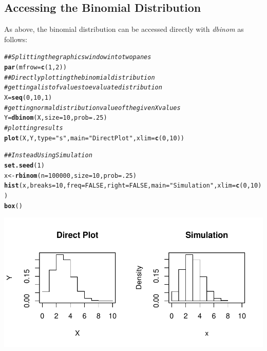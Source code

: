 \documentclass{report}\usepackage[]{graphicx}\usepackage[]{color}
\makeatletter
\def\maxwidth{ %
  \ifdim\Gin@nat@width>\linewidth
    \linewidth
  \else
    \Gin@nat@width
  \fi
}
\newcommand{\hlnum}[1]{\textcolor[rgb]{0.686,0.059,0.569}{#1}}%
\newcommand{\hlstr}[1]{\textcolor[rgb]{0.192,0.494,0.8}{#1}}%
\newcommand{\hlcom}[1]{\textcolor[rgb]{0.678,0.584,0.686}{\textit{#1}}}%
\newcommand{\hlstd}[1]{\textcolor[rgb]{0.345,0.345,0.345}{#1}}%
\newcommand{\hlkwb}[1]{\textcolor[rgb]{0.69,0.353,0.396}{#1}}%
\newcommand{\hlkwc}[1]{\textcolor[rgb]{0.333,0.667,0.333}{#1}}%
\newcommand{\hlkwd}[1]{\textcolor[rgb]{0.737,0.353,0.396}{\textbf{#1}}}%
\newenvironment{kframe}{%
 \def\at@end@of@kframe{}%
 \ifinner\ifhmode%
  \def\at@end@of@kframe{\end{minipage}}%
  \begin{minipage}{\columnwidth}%
 \fi\fi%
 \def\FrameCommand##1{\hskip\@totalleftmargin \hskip-\fboxsep
 \colorbox{shadecolor}{##1}\hskip-\fboxsep
     \hskip-\linewidth \hskip-\@totalleftmargin \hskip\columnwidth}%
 \MakeFramed {\advance\hsize-\width
   \@totalleftmargin\z@ \linewidth\hsize
   \@setminipage}}%
 {\par\unskip\endMakeFramed%
 \at@end@of@kframe}
\newenvironment{knitrout}{}{} %
\makeatother
\begin{document}
\subsection{Accessing the Binomial Distribution}
As above, the binomial distribution can be accessed directly with \textit{dbinom} as follows: 
\begin{knitrout}
\color{fgcolor}\begin{kframe}
\begin{alltt}
\hlcom{## Splitting the graphics window into two panes }
\hlkwd{par}\hlstd{(}\hlkwc{mfrow}\hlstd{=}\hlkwd{c}\hlstd{(}\hlnum{1}\hlstd{,}\hlnum{2}\hlstd{))}
\hlcom{## Directly plotting the binomial distribution}
 \hlcom{# getting a list of values to evaluate distribution}
\hlstd{X} \hlkwb{=} \hlkwd{seq}\hlstd{(}\hlnum{0}\hlstd{,} \hlnum{10}\hlstd{,} \hlnum{1}\hlstd{)}
 \hlcom{# getting normal distribution value of the given X values }
\hlstd{Y} \hlkwb{=} \hlkwd{dbinom}\hlstd{(X,} \hlkwc{size} \hlstd{=} \hlnum{10}\hlstd{,} \hlkwc{prob} \hlstd{=} \hlnum{.25}\hlstd{)}
 \hlcom{# plotting results }
\hlkwd{plot}\hlstd{(X,Y,} \hlkwc{type} \hlstd{=} \hlstr{"s"}\hlstd{,} \hlkwc{main} \hlstd{=} \hlstr{"Direct Plot"}\hlstd{,} \hlkwc{xlim} \hlstd{=} \hlkwd{c}\hlstd{(}\hlnum{0}\hlstd{,}\hlnum{10}\hlstd{))}

\hlcom{## Instead Using Simulation}
\hlkwd{set.seed}\hlstd{(}\hlnum{1}\hlstd{)}
\hlstd{x} \hlkwb{<-} \hlkwd{rbinom}\hlstd{(}\hlkwc{n} \hlstd{=} \hlnum{100000}\hlstd{,} \hlkwc{size} \hlstd{=} \hlnum{10}\hlstd{,} \hlkwc{prob} \hlstd{=} \hlnum{.25}\hlstd{)}
\hlkwd{hist}\hlstd{(x,} \hlkwc{breaks} \hlstd{=} \hlnum{10}\hlstd{,} \hlkwc{freq} \hlstd{=} \hlnum{FALSE}\hlstd{,}\hlkwc{right} \hlstd{=} \hlnum{FALSE}\hlstd{,} \hlkwc{main} \hlstd{=} \hlstr{"Simulation"}\hlstd{,} \hlkwc{xlim} \hlstd{=} \hlkwd{c}\hlstd{(}\hlnum{0}\hlstd{,}\hlnum{10}\hlstd{))}
\hlkwd{box}\hlstd{()}
\end{alltt}
\end{kframe}

{\centering \includegraphics[width=\maxwidth]{figure/unnamed-chunk-57-1} 

}



\end{knitrout}
\end{document}
